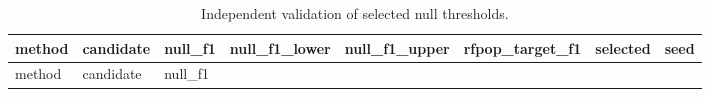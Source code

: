 \documentclass[
  10pt,
]{article}
\begin{document}
\begin{longtable}[]{@{}
  >{\raggedright\arraybackslash}p{}
  >{\raggedleft\arraybackslash}p{}
  >{\raggedleft\arraybackslash}p{}
  >{\raggedleft\arraybackslash}p{}
  >{\raggedleft\arraybackslash}p{}
  >{\raggedleft\arraybackslash}p{}
  >{\raggedright\arraybackslash}p{}
  >{\raggedleft\arraybackslash}p{}@{}}
\caption{Independent validation of selected null
thresholds.}\tabularnewline
\toprule\noalign{}
\begin{minipage}[b]{\linewidth}\raggedright
method
\end{minipage} & \begin{minipage}[b]{\linewidth}\raggedleft
candidate
\end{minipage} & \begin{minipage}[b]{\linewidth}\raggedleft
null\_f1
\end{minipage} & \begin{minipage}[b]{\linewidth}\raggedleft
null\_f1\_lower
\end{minipage} & \begin{minipage}[b]{\linewidth}\raggedleft
null\_f1\_upper
\end{minipage} & \begin{minipage}[b]{\linewidth}\raggedleft
rfpop\_target\_f1
\end{minipage} & \begin{minipage}[b]{\linewidth}\raggedright
selected
\end{minipage} & \begin{minipage}[b]{\linewidth}\raggedleft
seed
\end{minipage} \\
\midrule\noalign{}
\endfirsthead
\toprule\noalign{}
\begin{minipage}[b]{\linewidth}\raggedright
method
\end{minipage} & \begin{minipage}[b]{\linewidth}\raggedleft
candidate
\end{minipage} & \begin{minipage}[b]{\linewidth}\raggedleft
null\_f1
\end{minipage} & \begin{minipage}[b]{\linewidth}\raggedleft

\end{minipage}
\end{longtable}
\end{document}
